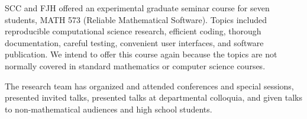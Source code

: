 \documentclass[11pt]{NSFamsart}
\begin{document}
SCC and FJH offered an experimental graduate seminar course for seven students, MATH 573 (Reliable Mathematical Software). Topics included reproducible computational science research, efficient coding, thorough documentation, careful testing, convenient user interfaces, and software publication.  We intend to offer this course again because the topics are not normally covered in standard mathematics or computer science courses.

The research team has organized and attended conferences and special sessions, presented invited talks, presented talks at departmental colloquia, and given talks to non-mathematical audiences and high school students.

\end{document}
